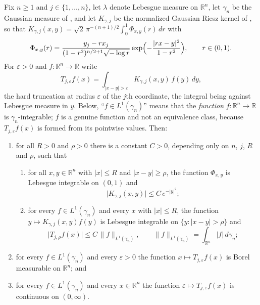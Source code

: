 \begin{lemma}
Fix $n \geq 1$ and $j \in \{1,\ldots,n\}$, let $\lambda$ denote Lebesgue measure
on $\mathbb{R}^n$, let $\gamma_n$ be the Gaussian measure of
, and let $K_{\gamma,j}$ be the normalized Gaussian Riesz
kernel of , so that
$K_{\gamma,j}(x,y) = \sqrt2\,\pi^{-(n+1)/2}\int_0^1\Phi_{x,y}(r)\,dr$ with
\[
  \Phi_{x,y}(r)
    = \frac{y_j - r x_j}{(1-r^2)^{n/2+1}\sqrt{-\log r}}
      \exp\Bigl(-\frac{|rx-y|^2}{1-r^2}\Bigr),
  \qquad r \in (0,1) .
\]
For $\varepsilon > 0$ and $f : \mathbb{R}^n \to \mathbb{R}$ write
\[
  T_{j,\varepsilon}f(x)
    = \int_{|x-y|>\varepsilon} K_{\gamma,j}(x,y)\,f(y)\,dy ,
\]
the hard truncation at radius $\varepsilon$ of the $j$th coordinate, the
integral being against Lebesgue measure in $y$.  Below, ``$f \in
L^1(\gamma_n)$'' means that the \emph{function} $f : \mathbb{R}^n \to
\mathbb{R}$ is $\gamma_n$-integrable; $f$ is a genuine function and not an
equivalence class, because $T_{j,\varepsilon}f(x)$ is formed from its pointwise
values.  Then:
\begin{enumerate}
\item for all $R > 0$ and $\rho > 0$ there is a constant $C > 0$, depending only
on $n$, $j$, $R$ and $\rho$, such that
  \begin{enumerate}
  \item for all $x,y \in \mathbb{R}^n$ with $|x| \leq R$ and
    $|x-y| \geq \rho$, the function $\Phi_{x,y}$ is Lebesgue integrable on
    $(0,1)$ and
    \[
      \bigl|K_{\gamma,j}(x,y)\bigr| \leq C\,e^{-|y|^2} ;
    \]
  \item for every $f \in L^1(\gamma_n)$ and every $x$ with $|x| \leq R$, the
    function $y \mapsto K_{\gamma,j}(x,y)f(y)$ is Lebesgue integrable on
    $\{y : |x-y| > \rho\}$ and
    \[
      \bigl|T_{j,\rho}f(x)\bigr| \leq C\,\|f\|_{L^1(\gamma_n)} ,
      \qquad \|f\|_{L^1(\gamma_n)} = \int_{\mathbb{R}^n}|f|\,d\gamma_n ;
    \]
  \end{enumerate}
\item for every $f \in L^1(\gamma_n)$ and every $\varepsilon > 0$ the function
$x \mapsto T_{j,\varepsilon}f(x)$ is Borel measurable on $\mathbb{R}^n$; and
\item for every $f \in L^1(\gamma_n)$ and every $x \in \mathbb{R}^n$ the
function $\varepsilon \mapsto T_{j,\varepsilon}f(x)$ is continuous on
$(0,\infty)$.
\end{enumerate}


\end{lemma}
